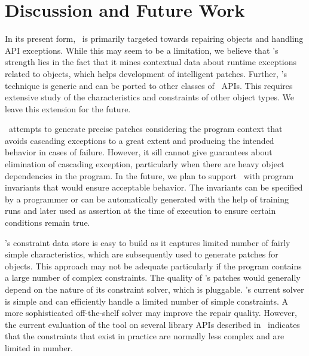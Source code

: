 \section{Discussion and Future Work}
\label{sec:discussion}


\begin{mylist}
 
 \item {} In its present form, \tool\ is
primarily targeted towards repairing  objects and handling API
exceptions. While this may seem to be a limitation, we believe that \tool{}'s
strength lies in the fact that it mines contextual data about runtime exceptions
related to  objects, which helps development of intelligent
patches. Further, \tool{}'s technique is generic and can be ported to other
classes of \java\ APIs. This requires extensive study of the characteristics
and constraints of other object types. We leave this extension for the future.

 \item {} \tool\ attempts to generate precise
patches considering the program context that avoids cascading exceptions to a
great extent and producing the intended behavior in cases of failure. However,
it sill cannot give guarantees about elimination of cascading exception,
particularly when there are heavy object dependencies in the program. In the
future, we plan to support \tool\ with program invariants that would ensure
acceptable behavior. The invariants can be specified by a programmer or can be
automatically generated with the help of training runs and later used as
assertion at the time of execution to ensure certain conditions remain true.

 \item {} \tool{}'s constraint data
store is easy to build as it captures limited number of fairly simple
 characteristics, which are subsequently used to generate patches
for  objects. This approach may not be adequate particularly if the
program contains a large number of complex constraints. The quality of \tool{}'s
patches would generally depend on the nature of its constraint solver, which is
pluggable. \tool{}'s current solver is simple and can efficiently handle a
limited number of simple constraints. A more sophisticated off-the-shelf solver
may improve the repair quality. However, the current evaluation of the tool on
several library APIs described in~ indicates that the
constraints that exist in practice are normally less complex and are limited in
number.

\end{mylist}